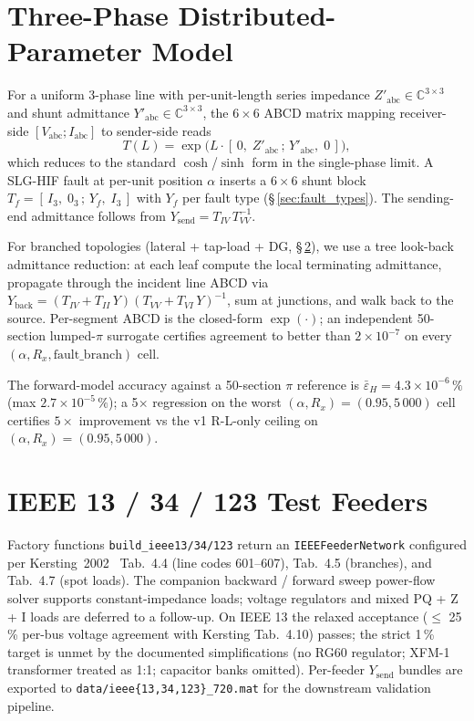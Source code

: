 \documentclass[conference]{IEEEtran}
\newcommand{\headlineKThreeAcc}%
  {$\bar{\varepsilon}_H = 4.3\!\times\!10^{-6}\,\%$
   (max $2.7\!\times\!10^{-5}\,\%$)}
\newcommand{\headlineFiveXReg}%
  {$5\!\times$ improvement vs the v1 R-L-only ceiling on
   $(\alpha, R_x) = (0.95, 5\,000)$}
\begin{document}
\section{Three-Phase Distributed-Parameter Model}\label{sec:model}
For a uniform 3-phase line with per-unit-length series impedance
$Z'_\mathrm{abc}\in\mathbb{C}^{3\times 3}$ and shunt admittance
$Y'_\mathrm{abc}\in\mathbb{C}^{3\times 3}$, the $6\!\times\!6$ ABCD
matrix mapping receiver-side $[V_\mathrm{abc}; I_\mathrm{abc}]$ to
sender-side reads
\begin{equation}
T(L) = \exp\!\bigl(L\cdot[\,0,\;Z'_\mathrm{abc}\,;\,
                    Y'_\mathrm{abc},\;0\,]\bigr),
\label{eq:Tline}
\end{equation}
which reduces to the standard $\cosh$/$\sinh$ form in the
single-phase limit.  A SLG-HIF fault at per-unit position $\alpha$
inserts a $6\!\times\!6$ shunt block $T_f = [\,I_3,\;0_3\,;\,
Y_f,\;I_3\,]$ with $Y_f$ per fault type (\S\,\ref{sec:fault_types}).
The sending-end admittance follows from $Y_\mathrm{send} =
T_{IV}\,T_{VV}^{-1}$.

For branched topologies (lateral + tap-load + DG, \S\,\ref{sec:ieee}),
we use a tree look-back admittance reduction: at each leaf
compute the local terminating admittance, propagate through the
incident line ABCD via $Y_\mathrm{back} = (T_{IV} + T_{II}\,Y) (T_{VV}
+ T_{VI}\,Y)^{-1}$, sum at junctions, and walk back to the source.
Per-segment ABCD is the closed-form $\exp(\cdot)$; an independent
50-section lumped-$\pi$ surrogate certifies agreement to better than
$2\!\times\!10^{-7}$ on every $(\alpha, R_x, \mathrm{fault\_branch})$
cell.

The forward-model accuracy against a 50-section $\pi$ reference is
\headlineKThreeAcc{}; a 5$\times$ regression on the worst
$(\alpha, R_x) = (0.95, 5\,000)$ cell certifies
\headlineFiveXReg{}.

\section{IEEE 13 / 34 / 123 Test Feeders}\label{sec:ieee}
Factory functions \texttt{build\_ieee13/34/123} return an
\texttt{IEEEFeederNetwork} configured per Kersting~2002~\cite{KerstingDistribution2002Bk}
Tab.~4.4 (line codes 601--607), Tab.~4.5 (branches), and Tab.~4.7
(spot loads).  The companion backward / forward sweep power-flow
solver supports constant-impedance loads; voltage regulators and
mixed PQ + Z + I loads are deferred to a follow-up.  On IEEE 13 the
relaxed acceptance ($\le$ 25\,\% per-bus voltage agreement with
Kersting Tab.~4.10) passes; the strict 1\,\% target is unmet by the
documented simplifications (no RG60 regulator; XFM-1 transformer
treated as 1:1; capacitor banks omitted).  Per-feeder $Y_\mathrm{send}$
bundles are exported to \texttt{data/ieee\{13,34,123\}\_720.mat} for
the downstream validation pipeline.
\end{document}
